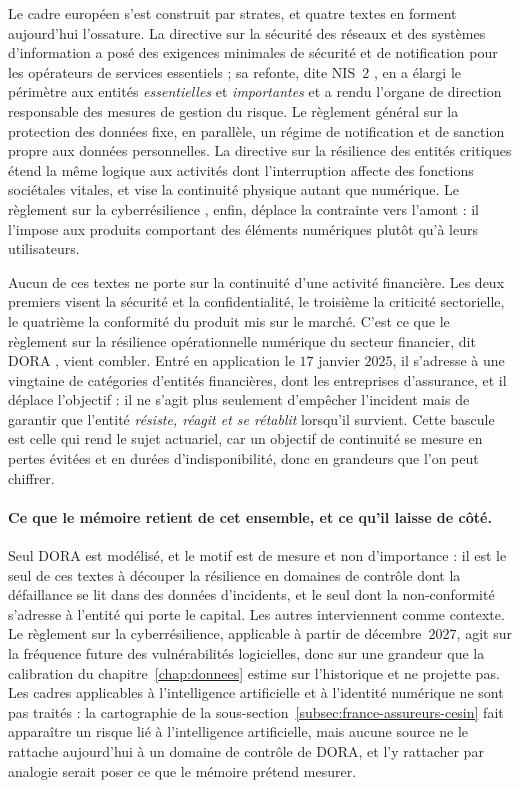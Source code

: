Le cadre européen s'est construit par strates, et quatre textes en forment aujourd'hui l'ossature.
La directive sur la sécurité des réseaux et des systèmes d'information a posé des exigences
minimales de sécurité et de notification pour les opérateurs de services essentiels ; sa refonte,
dite NIS~2 \citep{NIS2Directive2022}, en a élargi le périmètre aux entités \emph{essentielles} et
\emph{importantes} et a rendu l'organe de direction responsable des mesures de gestion du risque.
Le règlement général sur la protection des données \citep{RGPD2016} fixe, en parallèle, un régime de
notification et de sanction propre aux données personnelles. La directive sur la résilience des
entités critiques \citep{REC2022} étend la même logique aux activités dont l'interruption affecte
des fonctions sociétales vitales, et vise la continuité physique autant que numérique. Le
règlement sur la cyberrésilience \citep{CRA2024}, enfin, déplace la contrainte vers l'amont : il
l'impose aux produits comportant des éléments numériques plutôt qu'à leurs utilisateurs.

Aucun de ces textes ne porte sur la continuité d'une activité financière. Les deux premiers visent
la sécurité et la confidentialité, le troisième la criticité sectorielle, le quatrième la conformité
du produit mis sur le marché. C'est ce que le règlement sur la résilience opérationnelle numérique
du secteur financier, dit DORA \citep{DORA2022}, vient combler. Entré en application le $17$ janvier $2025$, il s'adresse à une vingtaine de
catégories d'entités financières, dont les entreprises d'assurance, et il déplace l'objectif :
il ne s'agit plus seulement d'empêcher l'incident mais de garantir que l'entité \emph{résiste,
réagit et se rétablit} lorsqu'il survient. Cette bascule est celle qui rend le sujet actuariel,
car un objectif de continuité se mesure en pertes évitées et en durées d'indisponibilité, donc
en grandeurs que l'on peut chiffrer.

\paragraph{Ce que le mémoire retient de cet ensemble, et ce qu'il laisse de côté.} Seul DORA est
modélisé, et le motif est de mesure et non d'importance : il est le seul de ces textes à découper la
résilience en domaines de contrôle dont la défaillance se lit dans des données d'incidents, et le
seul dont la non-conformité s'adresse à l'entité qui porte le capital. Les autres interviennent comme
contexte. Le règlement sur la cyberrésilience, applicable à partir de décembre~$2027$, agit sur la
fréquence future des vulnérabilités logicielles, donc sur une grandeur que la calibration du
chapitre~\ref{chap:donnees} estime sur l'historique et ne projette pas. Les cadres applicables à
l'intelligence artificielle et à l'identité numérique ne sont pas traités : la cartographie de la
sous-section~\ref{subsec:france-assureurs-cesin} fait apparaître un risque lié à l'intelligence
artificielle, mais aucune source ne le rattache aujourd'hui à un domaine de contrôle de DORA, et
l'y rattacher par analogie serait poser ce que le mémoire prétend mesurer.

